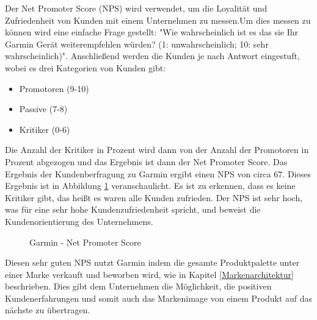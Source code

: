 Der Net Promoter Score (NPS) wird verwendet, um die Loyalität und Zufriedenheit von Kunden mit einem Unternehmen zu messen.Um dies messen zu können wird eine einfache Frage gestellt: "Wie wahrscheinlich ist es das sie Ihr Garmin Gerät weiterempfehlen würden? (1: unwahrscheinlich; 10: sehr wahrscheinlich)". Anschließend werden die Kunden je nach Antwort eingestuft, wobei es drei Kategorien von Kunden gibt:
\begin{itemize}
    \item Promotoren (9-10)
    \item Passive (7-8)
    \item Kritiker (0-6)
\end{itemize}
Die Anzahl der Kritiker in Prozent wird dann von der Anzahl der Promotoren in Prozent abgezogen und das Ergebnis ist dann der Net Promoter Score. Das Ergebnis der Kundenberfragung zu Garmin ergibt einen NPS von circa 67. Dieses Ergebnis ist in Abbildung \ref{fig:NPS} veranschaulicht. Es ist zu erkennen, dass es keine Kritiker gibt, das heißt es waren alle Kunden zufrieden. Der NPS ist sehr hoch, was für eine sehr hohe Kundenzufriedenheit spricht, und beweist die Kundenorientierung des Unternehmens. \cite{Netigate-NPS} 

\begin{figure}[h]
	\centering
    \vspace{0.5cm}
	\caption{Garmin - Net Promoter Score}
    \label{fig:NPS}
\end{figure}

Diesen sehr guten NPS nutzt Garmin indem die gesamte Produktpalette unter einer Marke verkauft und beworben wird, wie in Kapitel \ref{Markenarchitektur} beschrieben. Dies gibt dem Unternehmen die Möglichkeit, die positiven Kundenerfahrungen und somit auch das Markenimage von einem Produkt auf das nächste zu übertragen. 

